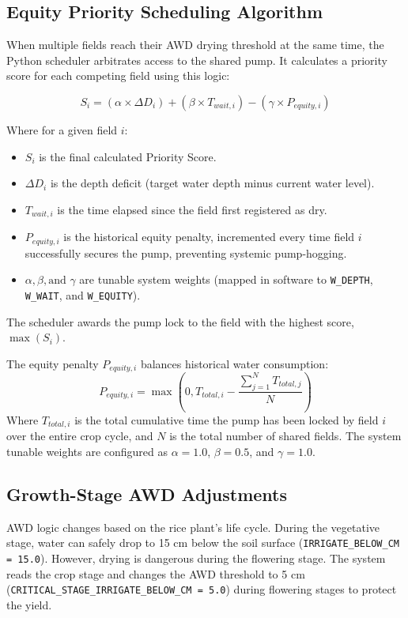 \documentclass[conference]{IEEEtran}
\begin{document}
\subsection{Equity Priority Scheduling Algorithm}
When multiple fields reach their AWD drying threshold at the same time, the Python scheduler arbitrates access to the shared pump. It calculates a priority score for each competing field using this logic:

\begin{equation}
S_i = (\alpha \times \Delta D_i) + (\beta \times T_{wait, i}) - (\gamma \times P_{equity, i})
\end{equation}

Where for a given field $i$:
\begin{itemize}
    \item $S_i$ is the final calculated Priority Score.
    \item $\Delta D_i$ is the depth deficit (target water depth minus current water level).
    \item $T_{wait, i}$ is the time elapsed since the field first registered as dry.
    \item $P_{equity, i}$ is the historical equity penalty, incremented every time field $i$ successfully secures the pump, preventing systemic pump-hogging.
    \item $\alpha, \beta, \text{and } \gamma$ are tunable system weights (mapped in software to \texttt{W\_DEPTH}, \texttt{W\_WAIT}, and \texttt{W\_EQUITY}).
\end{itemize}

The scheduler awards the pump lock to the field with the highest score, $\max(S_i)$.

The equity penalty $P_{equity, i}$ balances historical water consumption:
\begin{equation}
P_{equity, i} = \max\left(0, T_{total, i} - \frac{\sum_{j=1}^{N} T_{total, j}}{N}\right)
\end{equation}
Where $T_{total, i}$ is the total cumulative time the pump has been locked by field $i$ over the entire crop cycle, and $N$ is the total number of shared fields. The system tunable weights are configured as $\alpha = 1.0$, $\beta = 0.5$, and $\gamma = 1.0$.

\subsection{Growth-Stage AWD Adjustments}
AWD logic changes based on the rice plant's life cycle. During the vegetative stage, water can safely drop to 15 cm below the soil surface (\texttt{IRRIGATE\_BELOW\_CM = 15.0}). However, drying is dangerous during the flowering stage. The system reads the crop stage and changes the AWD threshold to 5 cm (\texttt{CRITICAL\_STAGE\_IRRIGATE\_BELOW\_CM = 5.0}) during flowering stages to protect the yield.
\end{document}
